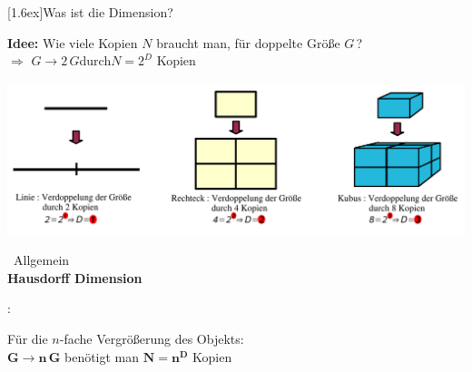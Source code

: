 \documentclass[final]{beamer}
\newlength{\columnheight}
\newlength{\marginw}
\newlength{\tw}
\newlength{\colsep}
\newlength{\colw}
\newenvironment{myTwoColPoster}{%
  \begin{minipage}[t]{\textwidth}%
    \hspace*{\marginw}%
    \hspace*{9.5bp}%
    \begin{minipage}[t]{\tw}}%
  {\end{minipage}%
   \hspace*{\marginw}%
   \end{minipage}}
\newenvironment{myCol}%
    {\begin{minipage}[t][\columnheight][t]{\colw}}%
    {\end{minipage}}
\newenvironment{textblock}[1]%
    {\begin{block}{\rule[-0.6ex]{0pt}{2.4ex}\raisebox{-0.25ex}[1.6ex]{#1}}%
     \vspace*{5mm}}%
    {\vspace*{5mm}\end{block}}
\begin{document}
\begin{frame}[t]{}
\begin{myTwoColPoster}
\begin{myCol}
\begin{textblock}{Was ist die Dimension?}
    \begin{center}
      \textbf{  \textcolor{IPForange}{Idee:} }Wie viele Kopien $N$ braucht man, f\"ur doppelte Gr\"o\ss e $G\,$?\\
      $\Rightarrow$ $G\to2\,G$\hspace*{1.5cm}durch\hspace*{1.5cm}$N=2^D$ Kopien
    \end{center}

    \includegraphics[width=1.01\textwidth]{fig/natD}\\[1.5cm]

    \begin{minipage}[c]{0.4\textwidth}\
      \textcolor{IPForange}{Allgemein} \\
      \textcolor{IPForange}{\textbf{Hausdorff Dimension}} 
    \end{minipage}\hfill
    \begin{minipage}[c]{0.01\textwidth}
      {\Huge :}
    \end{minipage}\hfill
    \begin{minipage}[c]{0.58\textwidth}
      \begin{center}
        F\"ur die $n$-fache Vergr\"o\ss erung des Objekts:\\
        $\boldsymbol{G\to n\,G}$ ben\"otigt man $\boldsymbol{N=n^D}$ Kopien
      \end{center}
    \end{minipage}


  \end{textblock}

  

\end{myCol}
\hfill
\begin{myCol}
  


\end{myCol}
\end{myTwoColPoster}
\end{frame}
\end{document}
